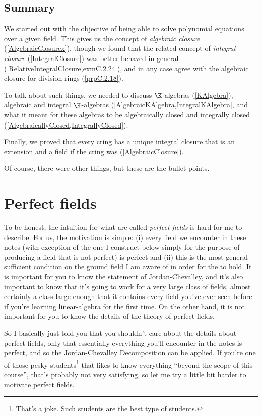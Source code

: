 \subsection{Summary}

We started out with the objective of being able to solve polynomial equations over a given field.  This gives us the concept of \emph{algebraic closure} (\cref{AlgebraicClosurex}), though we found that the related concept of \emph{integral closure} (\cref{IntegralClosure}) was better-behaved in general (\cref{RelativeIntegralClosure,exmC.2.24}), and in any case agree with the algebraic closure for division rings (\cref{prpC.2.18}).

To talk about such things, we needed to discuss $\K$-algebras (\cref{KAlgebra}), algebraic and integral $\K$-algebras (\cref{AlgebraicKAlgebra,IntegralKAlgebra}, and what it meant for these algebras to be algebraically closed and integrally closed (\cref{AlgebraicallyClosed,IntegrallyClosed}).

Finally, we proved that every cring has a unique integral closure that is an extension and a field if the cring was (\cref{AlgebraicClosure}).

Of course, there were other things, but these are the bullet-points.

\section{Perfect fields}

To be honest, the intuition for what are called \emph{perfect fields} is hard for me to describe.  For us, the motivation is simple:  (i) every field we encounter in these notes (with exception of the one I construct below simply for the purpose of producing a field that is not perfect) is perfect and (ii) this is the most general sufficient condition on the ground field I am aware of in order for the  to hold.  It is important for you to know the statement of Jordan-Chevalley, and it's also important to know that it's going to work for a very large class of fields, almost certainly a class large enough that it contains every field you've ever seen before if you're learning linear-algebra for the first time.  On the other hand, it is not important for you to know the details of the theory of perfect fields.

So I basically just told you that you shouldn't care about the details about perfect fields, only that essentially everything you'll encounter in the notes is perfect, and so the Jordan-Chevalley Decomposition can be applied.  If you're one of those pesky students\footnote{That's a joke.  Such students are the best type of students.} that likes to know everything ``beyond the scope of this course'', that's probably not very satisfying, so let me try a little bit harder to motivate perfect fields.

